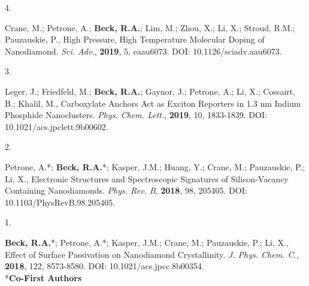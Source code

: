 \begin{cvpublications}



\cvpublication
{4.}
{\parbox[t]{0.95\textwidth}{\strut Crane, M.; Petrone, A.; \textbf{Beck, R.A.}; Lim, M.; Zhou, X.; Li, X.; Stroud, R.M.; Pauzauskie, P.,
High Pressure, High Temperature Molecular Doping of Nanodiamond.
\textit{Sci. Adv.}, \textbf{2019}, 5, eaau6073.
DOI: 10.1126/sciadv.aau6073.}}




\cvpublication
{3.}
{\parbox[t]{0.95\textwidth}{\strut Leger, J.; Friedfeld, M.; \textbf{Beck, R.A.}; Gaynor, J.; Petrone, A.; Li, X.; Cossairt, B.; Khalil, M., 
Carboxylate Anchors Act as Exciton Reporters in 1.3 nm Indium Phosphide Nanoclusters.
\textit{Phys. Chem. Lett.}, \textbf{2019}, 10, 1833-1839.
DOI: 10.1021/acs.jpclett.9b00602.}}




\cvpublication
{2.}
{\parbox[t]{0.95\textwidth}{\strut Petrone, A.*; \textbf{Beck, R.A.}*; Kasper, J.M.; Huang, Y.; Crane, M.; Pauzauskie, P.; Li, X., 
Electronic Structures and Spectroscopic Signatures of Silicon-Vacancy Containing Nanodiamonds.
\textit{Phys. Rev. B}, \textbf{2018}, 98, 205405.
DOI: 10.1103/PhysRevB.98.205405.}}




\cvpublication
{1.}
{\parbox[t]{0.95\textwidth}{\strut \textbf{Beck, R.A.}*; Petrone, A.*; Kasper, J.M.; Crane, M.; Pauzauskie, P.; Li, X., 
Effect of Surface Passivation on Nanodiamond Crystallinity.
\textit{J. Phys. Chem. C.}, \textbf{2018}, 122, 8573-8580.
DOI: 10.1021/acs.jpcc.8b00354. \\ \**\textbf{Co-First Authors}}}



\end{cvpublications}
